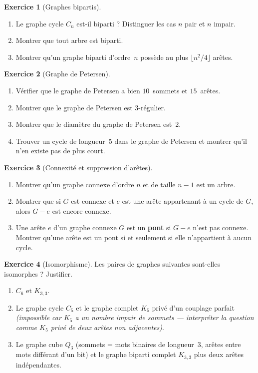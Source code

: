 \documentclass[12pt,a4paper,openany]{book}
\theoremstyle{definition}
\newtheorem{exercice}{Exercice}[chapter]
\theoremstyle{plain}
\theoremstyle{remark}
\begin{document}
\begin{exercice}[Graphes bipartis]
\label{exo:biparti}
\begin{enumerate}[label=(\alph*)]
  \item Le graphe cycle $C_n$ est-il biparti ? Distinguer les cas $n$ pair
    et $n$ impair.
  \item Montrer que tout arbre est biparti.
  \item Montrer qu'un graphe biparti d'ordre~$n$ possède au plus
    $\lfloor n^2/4 \rfloor$ arêtes.
\end{enumerate}
\end{exercice}

\begin{exercice}[Graphe de Petersen]
\label{exo:petersen}
\begin{enumerate}[label=(\alph*)]
  \item Vérifier que le graphe de Petersen a bien $10$~sommets et $15$~arêtes.
  \item Montrer que le graphe de Petersen est $3$-régulier.
  \item Montrer que le diamètre du graphe de Petersen est~$2$.
  \item Trouver un cycle de longueur~$5$ dans le graphe de Petersen et montrer
    qu'il n'en existe pas de plus court.
\end{enumerate}
\end{exercice}

\begin{exercice}[Connexité et suppression d'arêtes]
\label{exo:connexite}
\begin{enumerate}[label=(\alph*)]
  \item Montrer qu'un graphe connexe d'ordre $n$ et de taille $n - 1$ est
    un arbre.
  \item Montrer que si $G$ est connexe et $e$ est une arête appartenant à un
    cycle de $G$, alors $G - e$ est encore connexe.
  \item Une arête $e$ d'un graphe connexe $G$ est un \textbf{pont}
    si $G - e$ n'est pas connexe. Montrer qu'une arête est un pont si et
    seulement si elle n'appartient à aucun cycle.
\end{enumerate}
\end{exercice}

\begin{exercice}[Isomorphisme]
\label{exo:isomorphisme}
Les paires de graphes suivantes sont-elles isomorphes ? Justifier.
\begin{enumerate}[label=(\alph*)]
  \item $C_6$ et $K_{3,3}$.
  \item Le graphe cycle $C_5$ et le graphe complet $K_5$ privé d'un couplage
    parfait \emph{(impossible car $K_5$ a un nombre impair de sommets ---
    interpréter la question comme $K_5$ privé de deux arêtes non adjacentes)}.
  \item Le graphe cube $Q_3$ (sommets = mots binaires de longueur~3, arêtes
    entre mots différant d'un bit) et le graphe biparti complet $K_{3,3}$ plus
    deux arêtes indépendantes.
\end{enumerate}
\end{exercice}
\end{document}
